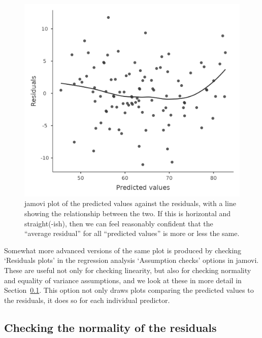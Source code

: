 \documentclass[
  a4paper,
]{book}
\begin{document}
\begin{figure}

\includegraphics[width=1\textwidth,height=\textheight]{images/fig12-18.png} \hfill{}

\caption{\label{fig-fig12-18}jamovi plot of the predicted values against
the residuals, with a line showing the relationship between the two. If
this is horizontal and straight(-ish), then we can feel reasonably
confident that the ``average residual'' for all ``predicted values'' is
more or less the same.}

\end{figure}

Somewhat more advanced versions of the same plot is produced by checking
`Residuals plots' in the regression analysis `Assumption checks' options
in jamovi. These are useful not only for checking linearity, but also
for checking normality and equality of variance assumptions, and we look
at these in more detail in
Section~\ref{sec-Checking-the-normality-of-the-residuals}. This option
not only draws plots comparing the predicted values to the residuals, it
does so for each individual predictor.

\hypertarget{sec-Checking-the-normality-of-the-residuals}{%
\subsection{Checking the normality of the
residuals}\label{sec-Checking-the-normality-of-the-residuals}}
\end{document}
